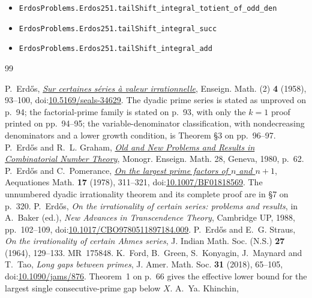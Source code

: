 \documentclass[11pt]{article}
\begin{document}
\begin{itemize}
  \item \nolinkurl{ErdosProblems.Erdos251.tailShift_integral_totient_of_odd_den}
  \item \nolinkurl{ErdosProblems.Erdos251.tailShift_integral_succ}
  \item \nolinkurl{ErdosProblems.Erdos251.tailShift_integral_add}
\end{itemize}
\begin{thebibliography}{99}
\small
\raggedright
\setlength{\itemsep}{0pt}
 P.~Erd\H{o}s,
  \href{https://users.renyi.hu/~p_erdos/1958-19.pdf}{\emph{Sur certaines
  s\'eries \`a valeur irrationnelle}},
  Enseign. Math. (2) \textbf{4} (1958), 93--100,
  doi:\href{https://doi.org/10.5169/seals-34629}{10.5169/seals-34629}.
  The dyadic prime series is stated as unproved on p.~94; the
  factorial-prime family is stated on p.~93, with only the $k=1$ proof printed
  on pp.~94--95; the variable-denominator classification, with nondecreasing
  denominators and a lower growth condition, is Theorem \S3 on pp.~96--97.
 P.~Erd\H{o}s and R.~L. Graham,
  \href{https://mathweb.ucsd.edu/~ronspubs/80_11_number_theory.pdf}{\emph{Old
  and New Problems and Results in Combinatorial Number Theory}},
  Monogr. Enseign. Math. 28, Geneva, 1980, p.~62.
 P.~Erd\H{o}s and C.~Pomerance,
  \href{https://doi.org/10.1007/BF01818569}{\emph{On the largest prime
  factors of $n$ and $n+1$}},
  Aequationes Math. \textbf{17} (1978), 311--321,
  doi:\href{https://doi.org/10.1007/BF01818569}{10.1007/BF01818569}.
  The unnumbered dyadic irrationality theorem and its complete proof are in
  \S7 on p.~320.
 P.~Erd\H{o}s, \emph{On the irrationality of certain series:
  problems and results}, in A.~Baker (ed.), \emph{New Advances in Transcendence
  Theory}, Cambridge UP, 1988, pp.~102--109,
  doi:\href{https://doi.org/10.1017/CBO9780511897184.009}{10.1017/CBO9780511897184.009}.
 P.~Erd\H{o}s and E.~G. Straus, \emph{On the
  irrationality of certain Ahmes series}, J. Indian Math. Soc. (N.S.)
  \textbf{27} (1964), 129--133. MR~175848.
 K.~Ford, B.~Green, S.~Konyagin, J.~Maynard and T.~Tao,
  \emph{Long gaps between primes}, J. Amer. Math. Soc. \textbf{31} (2018),
  65--105,
  doi:\href{https://doi.org/10.1090/jams/876}{10.1090/jams/876}.
  Theorem~1 on p.~66 gives the effective lower bound for the largest single
  consecutive-prime gap below $X$.
 A.~Ya. Khinchin,

\end{thebibliography}
\end{document}
